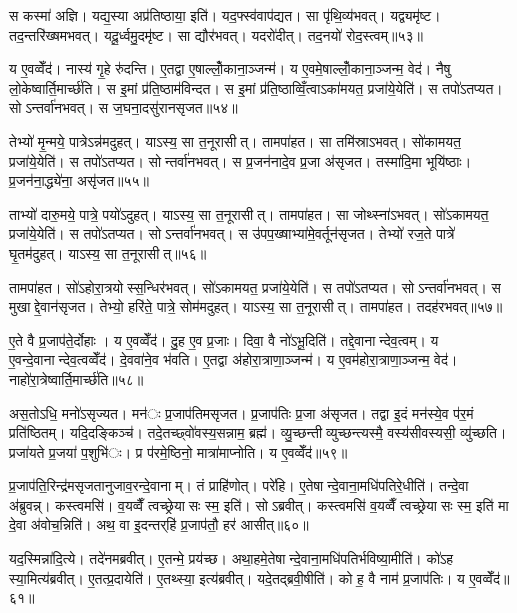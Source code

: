 स कस्मा॑ अज्ञि। यद्य॒स्या अप्र॑तिष्ठाया॒ इति॑। यद॒फ्स्व॑वाप॑द्यत। सा पृ॑थि॒व्य॑भवत्। यद्व्यमृ॑ष्ट। तद॒न्तरि॑ख्षमभवत्। यदू॒र्ध्वमु॒दमृ॑ष्ट। सा द्यौर॑भवत्। यदरो॑दीत्। तद॒नयो॑ रोद॒स्त्वम्॥५३॥

य ए॒वव्वेँद॑। नास्य॑ गृ॒हे रु॑दन्ति। ए॒तद्वा ए॒षाल्लोँ॒काना॒ञ्जन्म॑। य ए॒वमे॒षाल्लोँ॒काना॒ञ्जन्म॒ वेद॑। नैषु लो॒केष्वार्ति॒मार्च्छ॑ति। स इ॒मां प्र॑ति॒ष्ठाम॑विन्दत। स इ॒मां प्र॑ति॒ष्ठाव्विँ॒त्वाऽका॑मयत॒ प्रजा॑ये॒येति॑। स तपो॑ऽतप्यत। सोऽन्तर्वा॑नभवत्। स ज॒घना॒दसु॑रानसृजत॥५४॥

तेभ्यो॑ मृ॒न्मये॒ पात्रेऽन्न॑मदुहत्। याऽस्य॒ सा त॒नूरासीत्। तामपा॑हत। सा तमि॑स्राऽभवत्। सो॑कामयत॒ प्रजा॑ये॒येति॑। स तपो॑ऽतप्यत। सोन्तर्वा॑नभवत्। स प्र॒जन॑नादे॒व प्र॒जा अ॑सृजत। तस्मा॑दि॒मा भूयि॑ष्ठाः। प्र॒जन॑ना॒द्ध्ये॑ना॒ असृ॑जत॥५५॥

ताभ्यो॑ दारु॒मये॒ पात्रे॒ पयो॑ऽदुहत्। याऽस्य॒ सा त॒नूरासीत्। तामपा॑हत। सा जोथ्स्ना॑ऽभवत्। सो॑ऽकामयत॒ प्रजा॑ये॒येति॑। स तपो॑ऽतप्यत। सोऽन्तर्वा॑नभवत्। स उ॑पप॒ख्षाभ्या॑मे॒वर्तून॑सृजत। तेभ्यो॑ रज॒ते पात्रे॑ घृ॒तम॑दुहत्। याऽस्य॒ सा त॒नूरासीत्॥५६॥

तामपा॑हत। सो॑ऽहोरा॒त्रयोस्स॒न्धिर॑भवत्। सो॑ऽकामयत॒ प्रजा॑ये॒येति॑। स तपो॑ऽतप्यत। सोऽन्तर्वा॑नभवत्। स मुखाद्दे॒वान॑सृजत। तेभ्यो॒ हरि॑ते॒ पात्रे॒ सोम॑मदुहत्। याऽस्य॒ सा त॒नूरासीत्। तामपा॑हत। तदह॑रभवत्॥५७॥

ए॒ते वै प्र॒जाप॑ते॒र्दोहाः। य ए॒वव्वेँद॑। दु॒ह ए॒व प्र॒जाः। दिवा॒ वै नो॑ऽभू॒दिति॑। तद्दे॒वानान्देव॒त्वम्। य ए॒वन्दे॒वानान्देव॒त्वव्वेँद॑। दे॒ववा॑ने॒व भ॑वति। ए॒तद्वा अ॑होरा॒त्राणा॒ञ्जन्म॑। य ए॒वम॑होरा॒त्राणा॒ञ्जन्म॒ वेद॑। नाहो॑रा॒त्रेष्वार्ति॒मार्च्छ॑ति॥५८॥

अस॒तोऽधि॒ मनो॑ऽसृज्यत। मन॑ः प्र॒जाप॑तिमसृजत। प्र॒जाप॑तिः प्र॒जा अ॑सृजत। तद्वा इ॒दं मन॑स्ये॒व प॑र॒मं प्रति॑ष्ठितम्। यदि॒दङ्किञ्च॑। तदे॒तच्छ्वो॑वस्य॒सन्नाम॒ ब्रह्म॑। व्यु॒च्छन्तीव्युच्छन्त्यस्मै॒ वस्य॑सीवस्यसी॒ व्यु॑च्छति। प्रजा॑यते प्र॒जया॑ प॒शुभि॑ः। प्र प॑रमे॒ष्ठिनो॒ मात्रा॑माप्नोति। य ए॒वव्वेँद॑॥५९॥


प्र॒जाप॑ति॒रिन्द्र॑मसृजतानुजाव॒रन्दे॒वानाम्। तं प्राहि॑णोत्। परे॑हि। ए॒तेषान्दे॒वाना॒मधि॑पतिरे॒धीति॑। तन्दे॒वा अ॑ब्रुवन्न्। कस्त्वमसि॑। व॒यव्वैँ त्वच्छ्रेयासः स्म॒ इति॑। सोऽब्रवीत्। कस्त्वमसि॑ व॒यव्वैँ त्वच्छ्रेयासः स्म॒ इति॑ मा दे॒वा अ॑वोच॒न्निति॑। अथ॒ वा इ॒दन्तर्‌हि॑ प्र॒जाप॑तौ॒ हर॑ आसीत्॥६०॥

यद॒स्मिन्ना॑दि॒त्ये। तदे॑नमब्रवीत्। ए॒तन्मे॒ प्रय॑च्छ। अथा॒हमे॒तेषान्दे॒वाना॒मधि॑पतिर्भविष्या॒मीति॑। को॑ऽह स्या॒मित्य॑ब्रवीत्। ए॒तत्प्र॒दायेति॑। ए॒तथ्स्या॒ इत्य॑ब्रवीत्। यदे॒तद्ब्रवी॒षीति॑। को ह॒ वै नाम॑ प्र॒जाप॑तिः। य ए॒वव्वेँद॑॥६१॥

